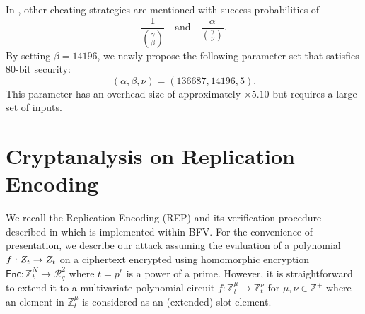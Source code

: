 \documentclass[runningheads]{llncs}
\newcommand{\bb}[1]{\mathbb{#1}}  %
\newcommand{\Z}{\mathbb{Z}}
\newcommand{\R}{\mathcal{R}}
\newcommand{\REP}{\textsf{REP}{}}
\newcommand{\enc}{\textsf{Enc}}
\begin{document}
        In \cite{cryptoeprint:PRF}, other cheating strategies are mentioned with success probabilities of 
        \[
        \frac{1}{\binom{\gamma}{\beta}} \quad \text{and} \quad \frac{\alpha}{\binom{\gamma}{\nu}}.
        \]
        By setting \(\beta = 14196\), we newly propose the following parameter set that satisfies \({80}\)-bit security:
        \[
        (\alpha,\beta,\nu) = (136687, 14196, 5).
        \]
        This parameter has an overhead size of approximately \(\times 5.10\) but requires a large set of inputs.

        


\section{Cryptanalysis on Replication Encoding} \label{sec:attacks on rep}
We recall the Replication Encoding (\REP) and its verification procedure described in \cite{VE} which is implemented within BFV. For the convenience of presentation, we describe our attack assuming the evaluation of a polynomial $f:\mathbb \Z_t\to \mathbb \Z_t$ on a ciphertext encrypted using homomorphic encryption $\enc: \Z_t^N \rightarrow \R^2_q$ where $t=p^r$ is a power of a prime. However, it is straightforward to extend it to a multivariate polynomial circuit $f: \bb Z_t^\mu \rightarrow \bb Z_t^\nu$ for $\mu, \nu \in \Z^+$ where an element in $\Z_t^\mu$ is considered as an (extended) slot element.
\end{document}
